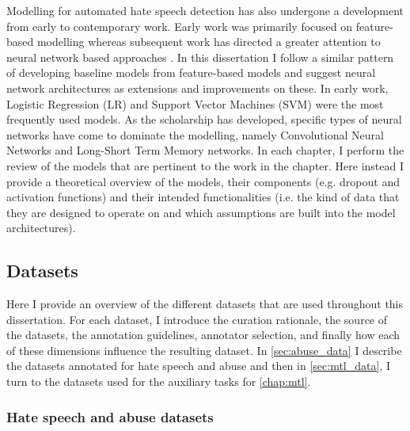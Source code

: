 Modelling for automated hate speech detection has also undergone a development from early to contemporary work. Early work was primarily focused on feature-based modelling \citep[e.g.][]{Waseem-Hovy:2016,Waseem:2016,Davidson:2017,Sahlgren:2018} whereas subsequent work has directed a greater attention to neural network based approaches \citep[e.g.][]{Kolhatkar:2021,Waseem:2018,Gamback:2017,Badjatiya:2017}. In this dissertation I follow a similar pattern of developing baseline models from feature-based models and suggest neural network architectures as extensions and improvements on these. In early work, Logistic Regression (LR) and Support Vector Machines (SVM) were the most frequently used models. As the scholarship has developed, specific types of neural networks have come to dominate the modelling, namely Convolutional Neural Networks and Long-Short Term Memory networks. In each chapter, I perform the review of the models that are pertinent to the work in the chapter. Here instead I provide a theoretical overview of the models, their components (e.g. dropout and activation functions) and their intended functionalities (i.e. the kind of data that they are designed to operate on and which assumptions are built into the model architectures).

\subsection{Datasets}\label{sec:datasets}

Here I provide an overview of the different datasets that are used throughout this dissertation. For each dataset, I introduce the curation rationale, the source of the datasets, the annotation guidelines, annotator selection, and finally how each of these dimensions influence the resulting dataset. In \autoref{sec:abuse_data} I describe the datasets annotated for hate speech and abuse and then in \autoref{sec:mtl_data}, I turn to the datasets used for the auxiliary tasks for \autoref{chap:mtl}.

\subsubsection{Hate speech and abuse datasets}\label{sub:abuse_data}

